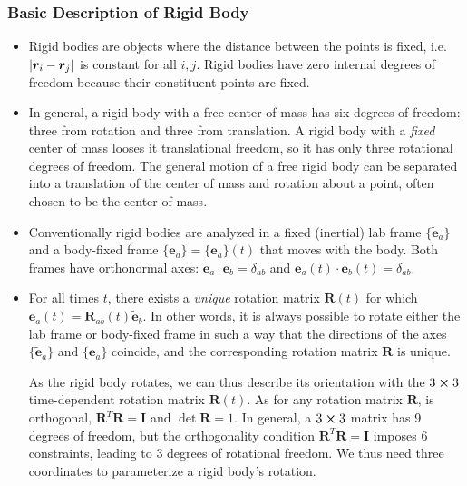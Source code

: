 \documentclass[11pt, a4paper]{article}
\newcommand{\e}{\bm{e}} %
\newcommand{\mat}[1]{\mathbf{#1}}
\begin{document}
\subsubsection{Basic Description of Rigid Body}
\begin{itemize}
	\item Rigid bodies are objects where the distance between the points is fixed, i.e. $ \abs{\bm{r}_{i} - \bm{r}_{j} } $ is constant for all $ i, j $. Rigid bodies have zero internal degrees of freedom because their constituent points are fixed.
		
	\item In general, a rigid body with a free center of mass has six degrees of freedom: three from rotation and three from translation. A rigid body with a \textit{fixed} center of mass looses it translational freedom, so it has only three rotational degrees of freedom. The general motion of a free rigid body can be separated into a translation of the center of mass and rotation about a point, often chosen to be the center of mass.
	
	\item Conventionally rigid bodies are analyzed in a fixed (inertial) lab frame $ \{\tilde{\e}_{a} \} $ and a body-fixed frame $ \{\e_{a} \} = \{\e_{a} \}(t)$ that moves with the body. Both frames have orthonormal axes: $ \tilde{\e}_{a} \cdot \tilde{\e}_{b} = \delta_{ab} $ and $ \e_{a}(t) \cdot \e_{b}(t) = \delta_{ab} $.
	
	\item For all times $ t $, there exists a \textit{unique} rotation matrix $ \mathbf{R}(t) $ for which $ \e_{a}(t) = \mat{R}_{ab}(t) \tilde{\e}_{b} $. In other words, it is always possible to rotate either the lab frame or body-fixed frame in such a way that the directions of the axes $ \{\tilde{\e}_{a} \} $ and $ \{\e_{a}\} $ coincide, and the corresponding rotation matrix $ \mat{R} $ is unique.
	
	As the rigid body rotates, we can thus describe its orientation with the $ 3 \cross 3 $ time-dependent rotation matrix $ \mathbf{R}(t) $. As for any rotation matrix $ \mat{R} $, is orthogonal, $ \mathbf{R}^{T} \mathbf{R} = \mathbf{I} $ and $ \det \mat{R} = 1 $. In general, a $ 3 \cross 3 $ matrix has 9 degrees of freedom, but the orthogonality condition $ \mathbf{R}^{T} \mathbf{R} = \mathbf{I} $ imposes 6 constraints, leading to 3 degrees of rotational freedom. We thus need three coordinates to parameterize a rigid body's rotation.

\end{itemize}
\end{document}
